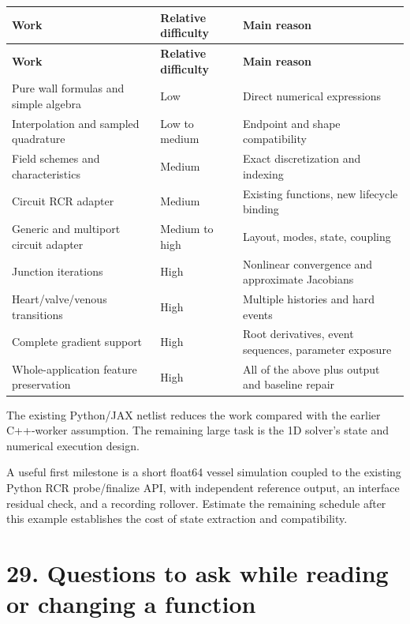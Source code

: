 \documentclass[11pt,a4paper]{article}
\begin{document}
\begingroup\footnotesize
\setlength{\tabcolsep}{4pt}
\begin{longtable}{>{\raggedright\arraybackslash}p{}>{\raggedright\arraybackslash}p{}>{\raggedright\arraybackslash}p{}}
\toprule
\textbf{Work} & \textbf{Relative difficulty} & \textbf{Main reason} \\
\midrule
\endfirsthead
\textbf{Work} & \textbf{Relative difficulty} & \textbf{Main reason} \\
\midrule
\endhead
\bottomrule
\endfoot
Pure wall formulas and simple algebra & Low & Direct numerical expressions \\
Interpolation and sampled quadrature & Low to medium & Endpoint and shape compatibility \\
Field schemes and characteristics & Medium & Exact discretization and indexing \\
Circuit RCR adapter & Medium & Existing functions, new lifecycle binding \\
Generic and multiport circuit adapter & Medium to high & Layout, modes, state, coupling \\
Junction iterations & High & Nonlinear convergence and approximate Jacobians \\
Heart/valve/venous transitions & High & Multiple histories and hard events \\
Complete gradient support & High & Root derivatives, event sequences, parameter exposure \\
Whole-application feature preservation & High & All of the above plus output and baseline repair \\
\end{longtable}
\endgroup
The existing Python/JAX netlist reduces the work compared with the earlier C++-worker assumption. The remaining large task is the 1D solver's state and numerical execution design.

A useful first milestone is a short float64 vessel simulation coupled to the existing Python RCR probe/finalize API, with independent reference output, an interface residual check, and a recording rollover. Estimate the remaining schedule after this example establishes the cost of state extraction and compatibility.

\clearpage
\section{29. Questions to ask while reading or changing a function}
\end{document}
